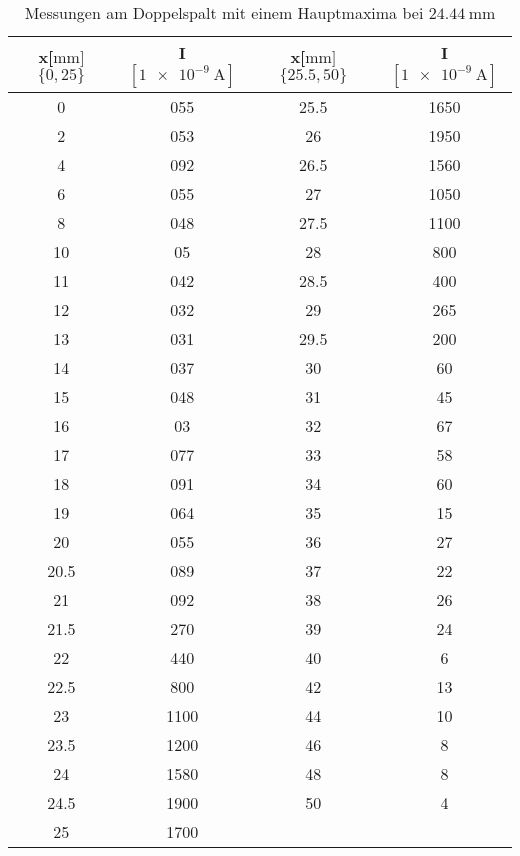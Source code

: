 \begin{table}
    \centering
    \caption{Messungen am Doppelspalt mit einem Hauptmaxima bei $\SI{24.44}{\mm}$}
    \label{tab:doppel}
    \begin{tabular}{c c c c}
        \toprule
        x[$\si{\mm}]$  $\{0,25\}$ & I $[\SI{1e-9}{\ampere}]$ &  x[$\si{\mm}]$  $\{25.5,50\}$ & I $[\SI{1e-9}{\ampere}]$\\
        \midrule
        0      &     055  &    25.5   &    1650   \\ 
        2      &     053  &    26     &    1950   \\ 
        4      &     092  &    26.5   &    1560   \\ 
        6      &     055  &    27     &    1050   \\ 
        8      &     048  &    27.5   &    1100   \\ 
        10     &     05   &    28     &    800    \\
        11     &     042  &    28.5   &    400    \\ 
        12     &     032  &    29     &    265    \\ 
        13     &     031  &    29.5   &    200    \\ 
        14     &     037  &    30     &    60     \\ 
        15     &     048  &    31     &    45     \\ 
        16     &     03   &    32     &    67     \\
        17     &     077  &    33     &    58     \\ 
        18     &     091  &    34     &    60     \\ 
        19     &     064  &    35     &    15     \\ 
        20     &     055  &    36     &    27     \\ 
        20.5   &     089  &    37     &    22     \\ 
        21     &     092  &    38     &    26     \\ 
        21.5   &     270  &    39     &    24     \\ 
        22     &     440  &    40     &    6      \\ 
        22.5   &     800  &    42     &    13     \\ 
        23     &     1100 &     44    &     10    \\  
        23.5   &     1200 &     46    &     8     \\  
        24     &     1580 &     48    &     8     \\  
        24.5   &     1900 &     50    &     4     \\  
        25     &     1700 &     ~ & ~ \\
       \bottomrule
    \end{tabular}
\end{table}          
          
          
          
          
           
          
          
          
          
